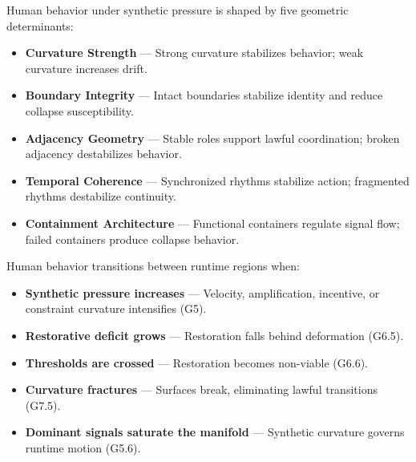 \medskip

\noindent Human behavior under synthetic pressure is shaped by five geometric
determinants:

\begin{itemize}[leftmargin=1.2cm]
    \item \textbf{Curvature Strength} — Strong curvature stabilizes behavior;
    weak curvature increases drift.

    \item \textbf{Boundary Integrity} — Intact boundaries stabilize identity and
    reduce collapse susceptibility.

    \item \textbf{Adjacency Geometry} — Stable roles support lawful coordination;
    broken adjacency destabilizes behavior.

    \item \textbf{Temporal Coherence} — Synchronized rhythms stabilize action;
    fragmented rhythms destabilize continuity.

    \item \textbf{Containment Architecture} — Functional containers regulate
    signal flow; failed containers produce collapse behavior.
\end{itemize}

\medskip

\noindent Human behavior transitions between runtime regions when:

\begin{itemize}[leftmargin=1.2cm]
    \item \textbf{Synthetic pressure increases} — Velocity, amplification,
    incentive, or constraint curvature intensifies (G5).

    \item \textbf{Restorative deficit grows} — Restoration falls behind
    deformation (G6.5).

    \item \textbf{Thresholds are crossed} — Restoration becomes non-viable
    (G6.6).

    \item \textbf{Curvature fractures} — Surfaces break, eliminating lawful
    transitions (G7.5).

    \item \textbf{Dominant signals saturate the manifold} — Synthetic curvature
    governs runtime motion (G5.6).
\end{itemize}

\medskip

